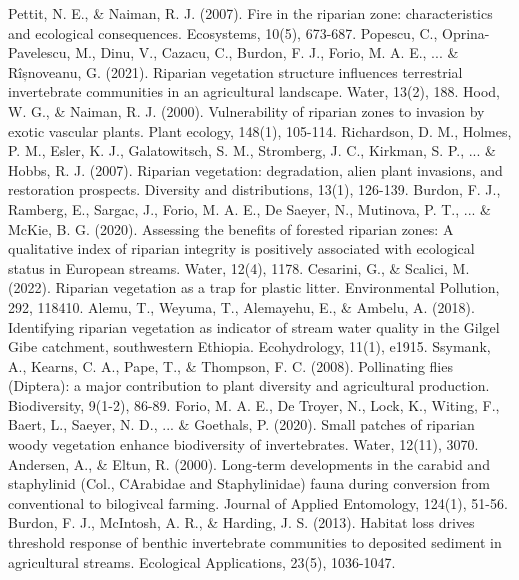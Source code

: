\documentclass[12pt]{article}
\numberwithin{equation}{section}
\begin{document}
\begin{thebibliography}{99}
  Pettit, N. E., \& Naiman, R. J. (2007). Fire in the riparian zone: characteristics and ecological consequences. Ecosystems, 10(5), 673-687.
  Popescu, C., Oprina-Pavelescu, M., Dinu, V., Cazacu, C., Burdon, F. J., Forio, M. A. E., ... \& Rîșnoveanu, G. (2021). Riparian vegetation structure influences terrestrial invertebrate communities in an agricultural landscape. Water, 13(2), 188.
  Hood, W. G., \& Naiman, R. J. (2000). Vulnerability of riparian zones to invasion by exotic vascular plants. Plant ecology, 148(1), 105-114.
  Richardson, D. M., Holmes, P. M., Esler, K. J., Galatowitsch, S. M., Stromberg, J. C., Kirkman, S. P., ... \& Hobbs, R. J. (2007). Riparian vegetation: degradation, alien plant invasions, and restoration prospects. Diversity and distributions, 13(1), 126-139.
  Burdon, F. J., Ramberg, E., Sargac, J., Forio, M. A. E., De Saeyer, N., Mutinova, P. T., ... \& McKie, B. G. (2020). Assessing the benefits of forested riparian zones: A qualitative index of riparian integrity is positively associated with ecological status in European streams. Water, 12(4), 1178.
  Cesarini, G., \& Scalici, M. (2022). Riparian vegetation as a trap for plastic litter. Environmental Pollution, 292, 118410.
  Alemu, T., Weyuma, T., Alemayehu, E., \& Ambelu, A. (2018). Identifying riparian vegetation as indicator of stream water quality in the Gilgel Gibe catchment, southwestern Ethiopia. Ecohydrology, 11(1), e1915.
  Ssymank, A., Kearns, C. A., Pape, T., \& Thompson, F. C. (2008). Pollinating flies (Diptera): a major contribution to plant diversity and agricultural production. Biodiversity, 9(1-2), 86-89.
  Forio, M. A. E., De Troyer, N., Lock, K., Witing, F., Baert, L., Saeyer, N. D., ... \& Goethals, P. (2020). Small patches of riparian woody vegetation enhance biodiversity of invertebrates. Water, 12(11), 3070.
  Andersen, A., \& Eltun, R. (2000). Long‐term developments in the carabid and staphylinid (Col., CArabidae and Staphylinidae) fauna during conversion from conventional to bilogivcal farming. Journal of Applied Entomology, 124(1), 51-56.
  Burdon, F. J., McIntosh, A. R., \& Harding, J. S. (2013). Habitat loss drives threshold response of benthic invertebrate communities to deposited sediment in agricultural streams. Ecological Applications, 23(5), 1036-1047.

\end{thebibliography}
\end{document}
